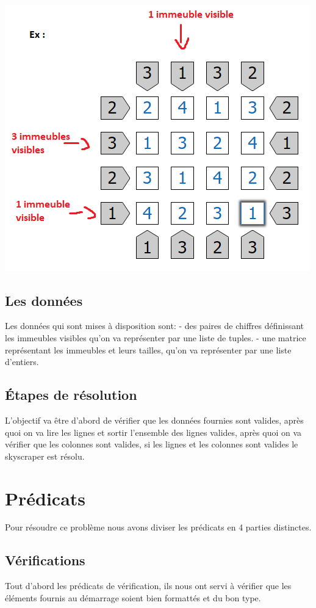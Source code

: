 \documentclass{article}
\begin{document}
\\\includegraphics{immeubles_vis.png}\\
\subsection{Les données}
Les données qui sont mises à disposition sont:
- des paires de chiffres définissant les immeubles visibles qu'on va représenter par une liste de tuples.
- une matrice représentant les immeubles et leurs tailles, qu'on va représenter par une liste d'entiers.
\subsection{Étapes de résolution}
L'objectif va être d'abord de vérifier que les données fournies sont valides, après quoi on va
lire les lignes et sortir l'ensemble des lignes valides, après quoi on va vérifier que les colonnes sont valides,
si les lignes et les colonnes sont valides le skyscraper est résolu.
\section{Prédicats}
Pour résoudre ce problème nous avons diviser les prédicats en 4 parties distinctes.
\subsection{Vérifications}
Tout d'abord les prédicats de vérification, ils nous ont servi à vérifier que les éléments fournis au démarrage 
soient bien formattés et du bon type.
\begin{center}
\end{center}
\end{document}
